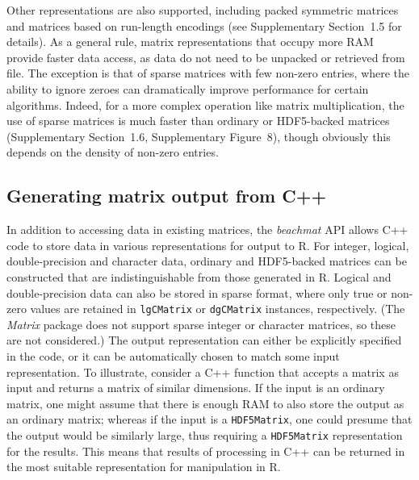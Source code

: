 \documentclass[10pt,letterpaper]{article}
\newcommand{\suppfigmatmult}{8}
\newcommand{\suppsecother}{1.5}
\newcommand{\suppsecmatmult}{1.6}
\newcommand{\suppseclayoutoptim}{2}
\newcommand{\beachmat}{\textit{beachmat}}
\newcommand{\code}[1]{\texttt{#1}}
\begin{document}
Other representations are also supported, including packed symmetric matrices and matrices based on run-length encodings (see Supplementary Section~\suppsecother{} for details).
As a general rule, matrix representations that occupy more RAM provide faster data access, as data do not need to be unpacked or retrieved from file.
The exception is that of sparse matrices with few non-zero entries, where the ability to ignore zeroes can dramatically improve performance for certain algorithms.
Indeed, for a more complex operation like matrix multiplication, the use of sparse matrices is much faster than ordinary or HDF5-backed matrices (Supplementary Section~\suppsecmatmult{}, Supplementary Figure~\suppfigmatmult{}), though obviously this depends on the density of non-zero entries.

\subsection*{Generating matrix output from C++}
In addition to accessing data in existing matrices, the \beachmat{} API allows C++ code to store data in various representations for output to R.
For integer, logical, double-precision and character data, ordinary and HDF5-backed matrices can be constructed that are indistinguishable from those generated in R.
Logical and double-precision data can also be stored in sparse format, where only true or non-zero values are retained in \code{lgCMatrix} or \code{dgCMatrix} instances, respectively.
(The \textit{Matrix} package does not support sparse integer or character matrices, so these are not considered.)
The output representation can either be explicitly specified in the code, or it can be automatically chosen to match some input representation.
To illustrate, consider a C++ function that accepts a matrix as input and returns a matrix of similar dimensions.
If the input is an ordinary matrix, one might assume that there is enough RAM to also store the output as an ordinary matrix;
whereas if the input is a \code{HDF5Matrix}, one could presume that the output would be similarly large, thus requiring a \code{HDF5Matrix} representation for the results.
This means that results of processing in C++ can be returned in the most suitable representation for manipulation in R.
 
\end{document}

